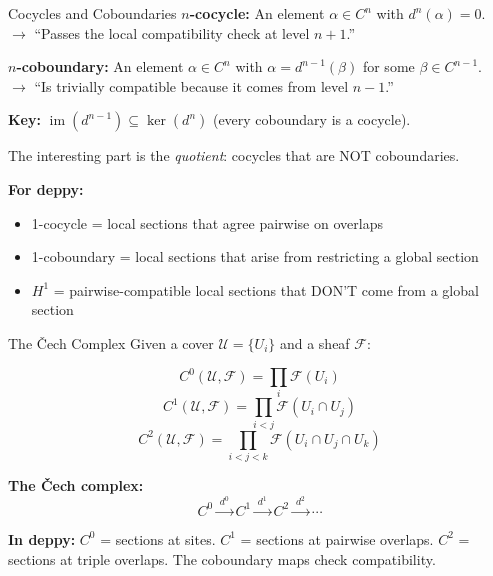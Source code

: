 \documentclass[aspectratio=169,10pt]{beamer}
\newcommand{\Fscr}{\mathcal{F}}
\newcommand{\Uscr}{\mathcal{U}}
\newcommand{\im}{\operatorname{im}}
\begin{document}
\begin{frame}{Cocycles and Coboundaries}
\textbf{$n$-cocycle:} An element $\alpha \in C^n$ with $d^n(\alpha) = 0$.\\
$\to$ ``Passes the local compatibility check at level $n+1$.''

\textbf{$n$-coboundary:} An element $\alpha \in C^n$ with $\alpha = d^{n-1}(\beta)$ for some $\beta \in C^{n-1}$.\\
$\to$ ``Is trivially compatible because it comes from level $n-1$.''

\vspace{0.5em}
\textbf{Key:} $\im(d^{n-1}) \subseteq \ker(d^n)$ (every coboundary is a cocycle).

The interesting part is the \emph{quotient}: cocycles that are NOT coboundaries.

\vspace{0.3em}
\textbf{For deppy:}
\begin{itemize}
  \item 1-cocycle = local sections that agree pairwise on overlaps
  \item 1-coboundary = local sections that arise from restricting a global section
  \item $H^1$ = pairwise-compatible local sections that DON'T come from a global section
\end{itemize}
\end{frame}

\begin{frame}{The \v{C}ech Complex}
Given a cover $\Uscr = \{U_i\}$ and a sheaf $\Fscr$:

\[
C^0(\Uscr, \Fscr) = \prod_i \Fscr(U_i)
\]
\[
C^1(\Uscr, \Fscr) = \prod_{i < j} \Fscr(U_i \cap U_j)
\]
\[
C^2(\Uscr, \Fscr) = \prod_{i < j < k} \Fscr(U_i \cap U_j \cap U_k)
\]

\textbf{The \v{C}ech complex:}
\[
C^0 \xrightarrow{\;d^0\;} C^1 \xrightarrow{\;d^1\;} C^2 \xrightarrow{\;d^2\;} \cdots
\]

\textbf{In deppy:} $C^0$ = sections at sites. $C^1$ = sections at pairwise overlaps. $C^2$ = sections at triple overlaps. The coboundary maps check compatibility.
\end{frame}
\end{document}
